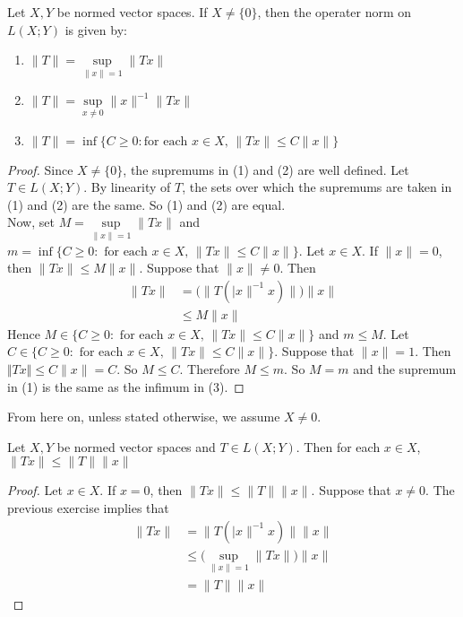 \documentclass{book}
\begin{document}
	\begin{ex} 
		Let $X,Y$ be normed vector spaces. If $X\neq \{0\}$, then the operater norm on $L(X; Y)$ is given by: 
		\begin{enumerate}
			\item $\|T\| = \sup\limits_{\|x\|=1}\|Tx\|$
			\item $\|T\| = \sup\limits_{x \neq 0}\|x\|^{-1} \|Tx\|$
			\item $\|T\| = \inf \{C \geq 0: \text{for each }x \in X\text{, } \|Tx \|\leq C\|x\|\}$
		\end{enumerate}
	\end{ex}
	
	\begin{proof} Since $X \neq \{0\}$, the supremums in (1) and (2) are well defined. Let $T \in L(X; Y)$. By linearity of $T$, the sets over which the supremums are taken in (1) and (2) are the same. So (1) and (2) are equal.\\
		Now, set $M = \sup\limits_{\|x \|=1} \|Tx \|$ and $m = \inf \{C \geq 0: \text{ for each }x \in X\text{, } \|Tx \|\leq C \|x \|\}$. Let $x \in X$. If $\|x \|=0$, then $\|Tx \|\leq M \|x \|$. Suppose that $\|x \|\neq 0$. Then 
		\begin{align*}
			\|Tx \|
			&= \bigg(\big\|T(|x\|^{-1}x)\big\|\bigg)\|x \|\\
			& \leq M \|x\|
		\end{align*}
		Hence $M \in \{C \geq 0: \text{ for each }x \in X\text{, } \|Tx \|\leq C \|x \|\}$ and $m \leq M$.
		Let $C \in \{C \geq 0: \text{ for each }x \in X\text{, } \|Tx \|\leq C \|x\|\}$. Suppose that $\|x \|=1$. Then $\Vert Tx\Vert \leq C \|x \|= C$. So $M \leq C$. Therefore $M \leq m$. So $M=m$ and the supremum in (1) is the same as the infimum in (3). 
	\end{proof}
	
	\begin{note}
		From here on, unless stated otherwise, we assume $X \neq 0$.
	\end{note}
	
	\begin{ex} 
		Let $X,Y$ be normed vector spaces and $T \in L(X; Y)$. Then for each $x \in X$, $\|Tx \| \leq \|T\|\|x \|$
	\end{ex}
	
	\begin{proof}
		Let $x \in X$. If $x = 0$, then $\|Tx \|\leq \|T \|\|x \|$. Suppose that $x \neq 0$. The previous exercise implies that 
		\begin{align*}
			\|Tx \|
			& = \| T(|x\|^{-1} x)\| \|x\| \\
			& \leq \bigg( \sup\limits_{\|x\|=1}\|Tx\| \bigg) \|x\| \\
			& =  \|T\| \|x\|
		\end{align*}
	\end{proof}
	
\end{document}

